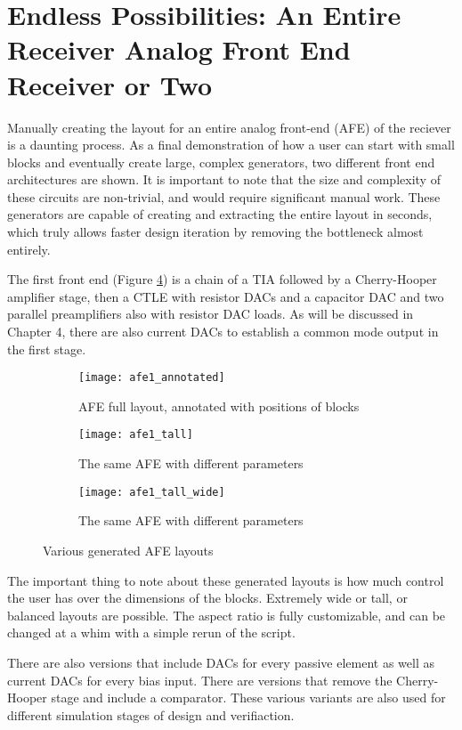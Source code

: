\section{Endless Possibilities: An Entire Receiver Analog Front End Receiver or Two}
Manually creating the layout for an entire analog front-end (AFE) of the reciever is a daunting process. As a final demonstration of how a user can start with small blocks and eventually create large, complex generators, two different front end architectures are shown. It is important to note that the size and complexity of these circuits are non-trivial, and would require significant manual work. These generators are capable of creating and extracting the entire layout in seconds, which truly allows faster design iteration by removing the bottleneck almost entirely. 

The first front end (Figure \ref{fig:afe1}) is a chain of a TIA followed by a Cherry-Hooper amplifier stage, then a CTLE with resistor DACs and a capacitor DAC and two parallel preamplifiers also with resistor DAC loads. As will be discussed in Chapter 4, there are also current DACs to establish a common mode output in the first stage. 
\begin{figure}[h]
\centering
\begin{subfigure}{1\linewidth}
  \centering
  \texttt{[image: afe1\_annotated]}
  \caption{AFE full layout, annotated with positions of blocks}
  \label{fig:sfig1}
\end{subfigure}
\begin{subfigure}{.8\linewidth}
  \centering
\texttt{[image: afe1\_tall]}
  \caption{The same AFE with different parameters}
  \label{fig:sfig2}
\end{subfigure}
\begin{subfigure}{.8\linewidth}
  \centering
\texttt{[image: afe1\_tall\_wide]}
  \caption{The same AFE with different parameters}
  \label{fig:sfig2}
\end{subfigure}
\caption{Various generated AFE layouts}
\label{fig:afe1}
\end{figure}
The important thing to note about these generated layouts is how much control the user has over the dimensions of the blocks. Extremely wide or tall, or balanced layouts are possible. The aspect ratio is fully customizable, and can be changed at a whim with a simple rerun of the script.

There are also versions that include DACs for every passive element as well as current DACs for every bias input. There are versions that remove the Cherry-Hooper stage and include a comparator. These various variants are also used for different simulation stages of design and verifiaction.


